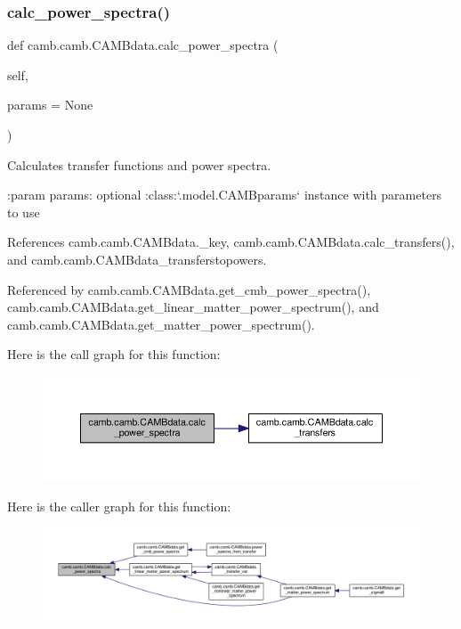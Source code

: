 \subsubsection{\texorpdfstring{calc\+\_\+power\+\_\+spectra()}{calc\_power\_spectra()}}
{\footnotesize\ttfamily def camb.\+camb.\+C\+A\+M\+Bdata.\+calc\+\_\+power\+\_\+spectra (\begin{DoxyParamCaption}\item[{}]{self,  }\item[{}]{params = {\ttfamily None} }\end{DoxyParamCaption})}

\begin{DoxyVerb}Calculates transfer functions and power spectra.

:param params: optional :class:`.model.CAMBparams` instance with parameters to use\end{DoxyVerb}
 

References camb.\+camb.\+C\+A\+M\+Bdata.\+\_\+key, camb.\+camb.\+C\+A\+M\+Bdata.\+calc\+\_\+transfers(), and camb.\+camb.\+C\+A\+M\+Bdata\+\_\+transferstopowers.



Referenced by camb.\+camb.\+C\+A\+M\+Bdata.\+get\+\_\+cmb\+\_\+power\+\_\+spectra(), camb.\+camb.\+C\+A\+M\+Bdata.\+get\+\_\+linear\+\_\+matter\+\_\+power\+\_\+spectrum(), and camb.\+camb.\+C\+A\+M\+Bdata.\+get\+\_\+matter\+\_\+power\+\_\+spectrum().

Here is the call graph for this function\+:
\nopagebreak
\begin{figure}[H]
\begin{center}
\leavevmode
\includegraphics[width=350pt]{classcamb_1_1camb_1_1CAMBdata_a5bed120089296027889dc5fc40a91f10_cgraph}
\end{center}
\end{figure}
Here is the caller graph for this function\+:
\nopagebreak
\begin{figure}[H]
\begin{center}
\leavevmode
\includegraphics[width=350pt]{classcamb_1_1camb_1_1CAMBdata_a5bed120089296027889dc5fc40a91f10_icgraph}
\end{center}
\end{figure}
\mbox{\label{classcamb_1_1camb_1_1CAMBdata_ad898126931124aa8b68591e04ca7f8cf}} 
